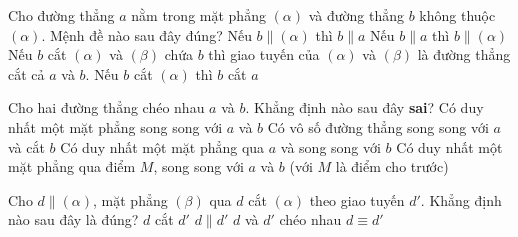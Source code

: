 \begin{ex}%
	Cho đường thẳng $a$ nằm trong mặt phẳng $\left(\alpha \right)$ và đường thẳng $b$ không thuộc $\left(\alpha \right)$. Mệnh đề nào sau đây đúng?
	\choice
	{Nếu $b\parallel \left(\alpha \right)$ thì $b\parallel a $}
	{\True Nếu $b\parallel a$ thì $b\parallel \left(\alpha \right) $}
	{Nếu $b$ cắt $\left(\alpha \right)$ và $\left(\beta \right)$ chứa $b$ thì giao tuyến của $\left(\alpha \right)$ và $\left(\beta \right)$ là đường thẳng cắt cả $a$ và $b $.
	}
	{Nếu $b$ cắt $\left(\alpha \right)$ thì $b$ cắt $a $}
\end{ex}


\begin{ex}%
	Cho hai đường thẳng chéo nhau $a$ và $b$. Khẳng định nào sau đây \textbf{sai}?
	\choice
	{\True Có duy nhất một mặt phẳng song song với $a$ và $b $}
	{Có vô số đường thẳng song song với $a$ và cắt $b $}
	{Có duy nhất một mặt phẳng qua $a$ và song song với $b $}
	{Có duy nhất một mặt phẳng qua điểm $M$, song song với $a$ và $b$ (với $M$ là điểm cho trước)}
\end{ex}


\begin{ex}%
	Cho $d\parallel \left(\alpha \right)$, mặt phẳng $\left(\beta \right)$ qua $d$ cắt $\left(\alpha \right)$ theo giao tuyến $d'$. Khẳng định nào sau đây là đúng?
	\choice
	{$d$ cắt $d'$}
	{\True $d\parallel d' $}
	{$d$ và $d'$ chéo nhau}
	{$d\equiv d' $}
\end{ex}

